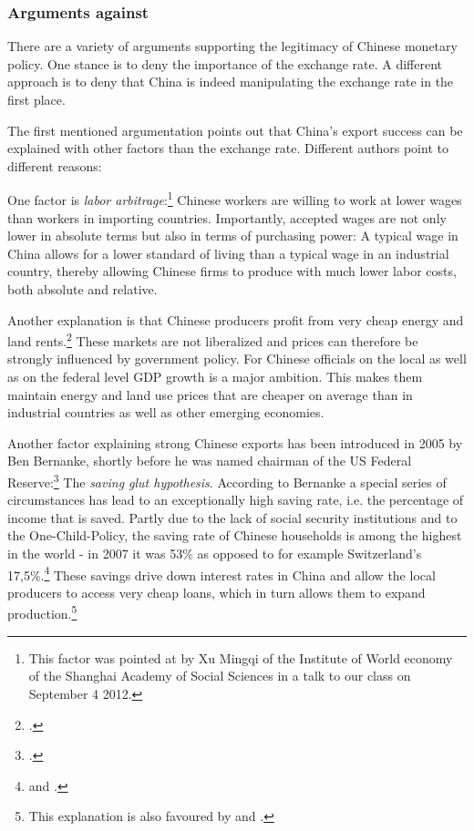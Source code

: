 \subsubsection{Arguments against}

There are a variety of arguments supporting the legitimacy of Chinese 
monetary policy. One stance is to deny the importance of the exchange 
rate. A different approach is to deny that China is indeed manipulating 
the exchange rate in the first place.

The first mentioned argumentation points out that China's export success 
can be explained with other factors than the exchange rate. Different 
authors point to different reasons: 

One factor is \emph{labor arbitrage}:\footnote{This factor was pointed at 
by Xu Mingqi of the Institute of World economy of the Shanghai Academy 
of Social Sciences in a talk to our class on September 4 2012.} Chinese 
workers are willing to work at lower wages than workers in importing 
countries. Importantly, accepted wages are not only lower in absolute 
terms but also in terms of purchasing power: A typical wage in China 
allows for a lower standard of living than a typical wage in an 
industrial country, thereby allowing Chinese firms to produce with much 
lower labor costs, both absolute and relative. 

Another explanation is that Chinese producers profit from very cheap 
energy and land rents.\footnote{\cite[pp. 25]{Huang2010}.} These markets 
are not liberalized and prices can therefore be strongly influenced by 
government policy. For Chinese officials on the local as well as on the 
federal level GDP growth is a major ambition. This makes them maintain 
energy and land use prices that are cheaper on average than in 
industrial countries as well as other emerging economies.

Another factor explaining strong Chinese exports has been introduced 
in 2005 by Ben Bernanke, shortly before he was named chairman of the US 
Federal Reserve:\footnote{\cite{Bernanke2005}.} The \emph{saving glut 
hypothesis}. According to Bernanke a special series of circumstances has 
lead to an exceptionally high saving rate, i.e. the percentage of income 
that is saved. Partly due to the lack of social security institutions 
and to the One-Child-Policy, the saving rate of Chinese households is 
among the highest in the world - in 2007 it was 53\% as opposed to for 
example Switzerland's 17,5\%.\footnote{\cite[pp. 20]{Yang2011} and 
\cite{BFS2012}.} These savings drive down interest rates in China and 
allow the local producers to access very cheap loans, which in turn 
allows them to expand production.\footnote{This explanation is also 
favoured by \cite[pp. 41]{Wyplosz2010} and \cite[p. 65]{Reisen2010}.}

